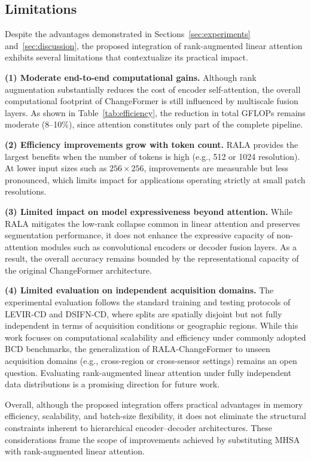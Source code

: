 \subsection{Limitations}
\label{subsec:limitations}

Despite the advantages demonstrated in Sections~\ref{sec:experiments} and~\ref{sec:discussion}, the proposed integration of rank-augmented linear attention exhibits several limitations that contextualize its practical impact.

\noindent \textbf{(1) Moderate end-to-end computational gains.} Although rank augmentation substantially reduces the cost of encoder self-attention, the overall computational footprint of ChangeFormer is still influenced by multiscale fusion layers. As shown in Table~\ref{tab:efficiency}, the reduction in total GFLOPs remains moderate (8--10\%), since attention constitutes only part of the complete pipeline.


\noindent \textbf{(2) Efficiency improvements grow with token count.} RALA provides the largest benefits when the number of tokens is high (e.g., 512 or 1024 resolution). At lower input sizes such as $256\times256$, improvements are measurable but less pronounced, which limits impact for applications operating strictly at small patch resolutions.

\noindent \textbf{(3) Limited impact on model expressiveness beyond attention.} While RALA mitigates the low-rank collapse common in linear attention and preserves segmentation performance, it does not enhance the expressive capacity of non-attention modules such as convolutional encoders or decoder fusion layers. As a result, the overall accuracy remains bounded by the representational capacity of the original ChangeFormer architecture.

\noindent \textbf{(4) Limited evaluation on independent acquisition domains.}
The experimental evaluation follows the standard training and testing protocols of LEVIR-CD and DSIFN-CD, where splits are spatially disjoint but not fully independent in terms of acquisition conditions or geographic regions. While this work focuses on computational scalability and efficiency under commonly adopted BCD benchmarks, the generalization of RALA-ChangeFormer to unseen acquisition domains (e.g., cross-region or cross-sensor settings) remains an open question. Evaluating rank-augmented linear attention under fully independent data distributions is a promising direction for future work.

\medskip
\noindent  Overall, although the proposed integration offers practical advantages in memory efficiency, scalability, and batch-size flexibility, it does not eliminate the structural constraints inherent to hierarchical encoder--decoder architectures. These considerations frame the scope of improvements achieved by substituting MHSA with rank-augmented linear attention.
